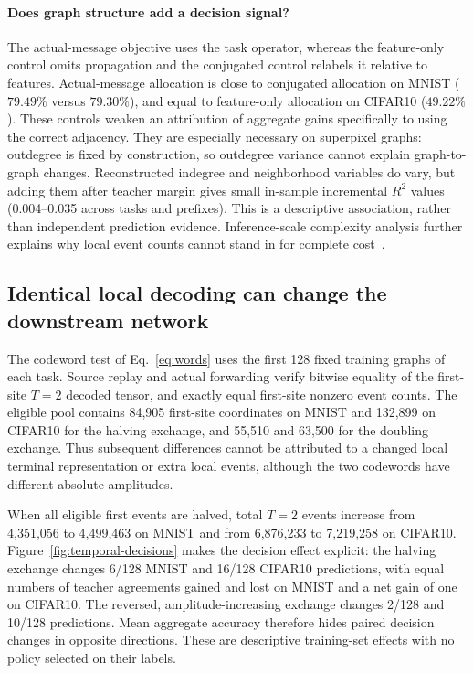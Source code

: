 \documentclass[10pt,twocolumn,letterpaper]{article}
\begin{document}
\paragraph{Does graph structure add a decision signal?}
The actual-message objective uses the task operator, whereas the feature-only control omits propagation and the conjugated control relabels it relative to features. Actual-message allocation is close to conjugated allocation on MNIST ($79.49\%$ versus $79.30\%$), and equal to feature-only allocation on CIFAR10 ($49.22\%$). These controls weaken an attribution of aggregate gains specifically to using the correct adjacency. They are especially necessary on superpixel graphs: outdegree is fixed by construction, so outdegree variance cannot explain graph-to-graph changes. Reconstructed indegree and neighborhood variables do vary, but adding them after teacher margin gives small in-sample incremental $R^2$ values (0.004--0.035 across tasks and prefixes). This is a descriptive association, rather than independent prediction evidence. Inference-scale complexity analysis further explains why local event counts cannot stand in for complete cost~\cite{bu2025complexity}.

\subsection{Identical local decoding can change the downstream network}
The codeword test of Eq.~\eqref{eq:words} uses the first 128 fixed training graphs of each task. Source replay and actual forwarding verify bitwise equality of the first-site $T=2$ decoded tensor, and exactly equal first-site nonzero event counts. The eligible pool contains 84,905 first-site coordinates on MNIST and 132,899 on CIFAR10 for the halving exchange, and 55,510 and 63,500 for the doubling exchange. Thus subsequent differences cannot be attributed to a changed local terminal representation or extra local events, although the two codewords have different absolute amplitudes.

When all eligible first events are halved, total $T=2$ events increase from 4,351,056 to 4,499,463 on MNIST and from 6,876,233 to 7,219,258 on CIFAR10. Figure~\ref{fig:temporal-decisions} makes the decision effect explicit: the halving exchange changes 6/128 MNIST and 16/128 CIFAR10 predictions, with equal numbers of teacher agreements gained and lost on MNIST and a net gain of one on CIFAR10. The reversed, amplitude-increasing exchange changes 2/128 and 10/128 predictions. Mean aggregate accuracy therefore hides paired decision changes in opposite directions. These are descriptive training-set effects with no policy selected on their labels.
\end{document}
